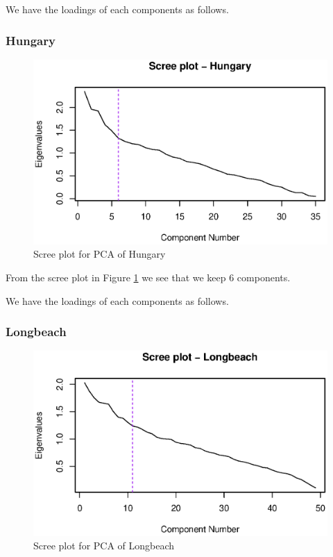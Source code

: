 \documentclass[a4paper]{article}
\begin{document}
We have the loadings of each components as follows.



\subsubsection{Hungary}

\begin{figure}[H]
	\begin{center}
		\includegraphics[width=12cm]{question3output/hunscreeplot.eps}
	\end{center}
	\caption{Scree plot for PCA of Hungary}
	\label{q3-hun-screeplot}
\end{figure}

From the scree plot in Figure \ref{q3-hun-screeplot} we see that we keep 6 components.

We have the loadings of each components as follows.



\subsubsection{Longbeach}

\begin{figure}[H]
	\begin{center}
		\includegraphics[width=12cm]{question3output/lonscreeplot.eps}
	\end{center}
	\caption{Scree plot for PCA of Longbeach}
	\label{q3-lon-screeplot}
\end{figure}
\end{document}
